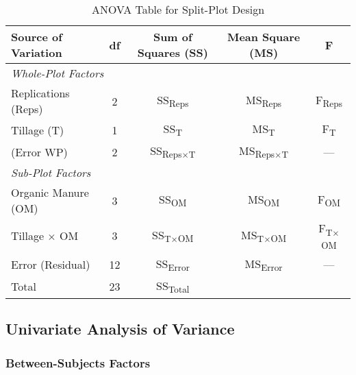 \documentclass[oneside,12pt,fleqn]{book}
\begin{document}
\begin{table}[h]
    \centering
    \caption{ANOVA Table for Split-Plot Design}
    \begin{tabular}{lcccc}
        \toprule
        \textbf{Source of Variation} & \textbf{df} & \textbf{Sum of Squares (SS)} & \textbf{Mean Square (MS)} & \textbf{F} \\
        \midrule
        \multicolumn{5}{l}{\textit{Whole-Plot Factors}} \\
        Replications (Reps) & 2 & SS\textsubscript{Reps} & MS\textsubscript{Reps} & F\textsubscript{Reps} \\
        Tillage (T) & 1 & SS\textsubscript{T} & MS\textsubscript{T} & F\textsubscript{T} \\
        (Error WP) & 2 & SS\textsubscript{Reps$\times$T} & MS\textsubscript{Reps$\times$T} & --- \\
        \midrule
        \multicolumn{5}{l}{\textit{Sub-Plot Factors}} \\
        Organic Manure (OM) & 3 & SS\textsubscript{OM} & MS\textsubscript{OM} & F\textsubscript{OM} \\
        Tillage $\times$ OM & 3 & SS\textsubscript{T$\times$OM} & MS\textsubscript{T$\times$OM} & F\textsubscript{T$\times$OM} \\
        Error (Residual) & 12 & SS\textsubscript{Error} & MS\textsubscript{Error} & --- \\
        \midrule
        Total & 23 & SS\textsubscript{Total} & & \\
        \bottomrule
    \end{tabular}
\end{table}
\newpage


\subsection*{Univariate Analysis of Variance}

\subsubsection*{Between-Subjects Factors}
\end{document}
